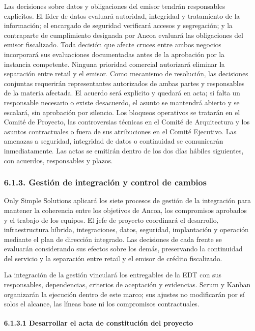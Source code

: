 \documentclass[11pt]{article}
\begin{document}
Las decisiones sobre datos y obligaciones del emisor tendrán
responsables explícitos. El líder de datos evaluará autoridad,
integridad y tratamiento de la información; el encargado de seguridad
verificará accesos y segregación; y la contraparte de cumplimiento
designada por Ancoa evaluará las obligaciones del emisor fiscalizado.
Toda decisión que afecte cruces entre ambos negocios incorporará sus
evaluaciones documentadas antes de la aprobación por la instancia
competente. Ninguna prioridad comercial autorizará eliminar la
separación entre retail y el emisor. Como mecanismo de resolución, las
decisiones conjuntas requerirán representantes autorizados de ambas
partes y responsables de la materia afectada. El acuerdo será explícito
y quedará en acta; si falta un responsable necesario o existe
desacuerdo, el asunto se mantendrá abierto y se escalará, sin aprobación
por silencio. Los bloqueos operativos se tratarán en el Comité de
Proyecto, las controversias técnicas en el Comité de Arquitectura y los
asuntos contractuales o fuera de sus atribuciones en el Comité
Ejecutivo. Las amenazas a seguridad, integridad de datos o continuidad
se comunicarán inmediatamente. Las actas se emitirán dentro de los dos
días hábiles siguientes, con acuerdos, responsables y plazos.

\subsubsection{6.1.3. Gestión de integración y control de cambios}\label{6-1-3-gestion-de-integracion-y-control-de-cambios}

Only Simple Solutions aplicará los siete procesos de gestión de la integración para mantener la coherencia entre los objetivos de Ancoa, los compromisos aprobados y el trabajo de los equipos. El jefe de proyecto coordinará el desarrollo, infraestructura híbrida, integraciones, datos, seguridad, implantación y operación mediante el plan de dirección integrado. Las decisiones de cada frente se evaluarán considerando sus efectos sobre los demás, preservando la continuidad del servicio y la separación entre retail y el emisor de crédito fiscalizado.

La integración de la gestión vinculará los entregables de la EDT con sus
responsables, dependencias, criterios de aceptación y evidencias. Scrum
y Kanban organizarán la ejecución dentro de este marco; sus ajustes no
modificarán por sí solos el alcance, las líneas base ni los compromisos
contractuales.

\paragraph{6.1.3.1 Desarrollar el acta de constitución del proyecto}\label{6-1-3-1-desarrollar-el-acta-de-constitucion-del-proyecto}
\end{document}
